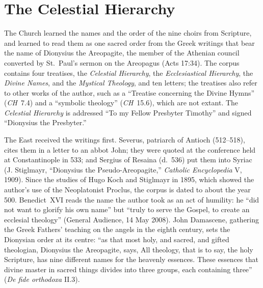 \section{The Celestial Hierarchy}\label{sec:ch}

The Church learned the names and the order of the nine choirs from
Scripture, and learned to read them as one sacred order from the Greek
writings that bear the name of Dionysius the Areopagite, the member of
the Athenian council converted by St.~Paul's sermon on the Areopagus
(Acts 17:34). The corpus contains four treatises,
the \emph{Celestial Hierarchy}, the \emph{Ecclesiastical Hierarchy}, the
\emph{Divine Names}, and the \emph{Mystical Theology}, and ten letters;
the treatises also refer to other works of the author, such as a
``Treatise concerning the Divine Hymns'' (\emph{CH}~7.4) and a ``symbolic
theology'' (\emph{CH}~15.6), which are not extant. The \emph{Celestial
Hierarchy} is addressed ``To my Fellow Presbyter Timothy'' and signed
``Dionysius the Presbyter.''

The East received the writings first. Severus, patriarch of Antioch
(512--518), cites them in a letter to an abbot John; they were quoted at
the conference held at Constantinople in 533; and Sergius of Resaina
(d.~536) put them into Syriac (J. Stiglmayr, ``Dionysius the
Pseudo-Areopagite,'' \emph{Catholic Encyclopedia} V, 1909). Since the
studies of Hugo Koch and Stiglmayr in 1895, which showed the author's use
of the Neoplatonist Proclus, the corpus is dated to about the year 500.
Benedict~XVI reads the name the author took as an act of humility: he
``did not want to glorify his own name'' but ``truly to serve the Gospel,
to create an ecclesial theology'' (General Audience, 14 May 2008). John
Damascene, gathering the Greek Fathers' teaching on the angels in the
eighth century, sets the Dionysian order at its centre: ``as that most
holy, and sacred, and gifted theologian, Dionysius the Areopagite, says,
All theology, that is to say, the holy Scripture, has nine different
names for the heavenly essences. These essences that divine master in
sacred things divides into three groups, each containing three''
(\emph{De fide orthodoxa} II.3).

